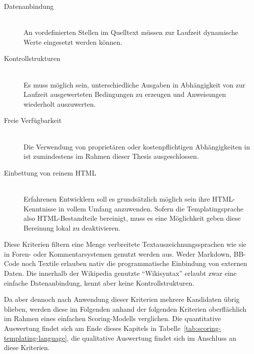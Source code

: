 \begin{description}
\item[Datenanbindung] \hfill \\
  An vordefinierten Stellen im Quelltext müssen zur Laufzeit dynamische Werte eingesetzt werden können.
\item[Kontrollstrukturen] \hfill \\
  Es muss möglich sein, unterschiedliche Ausgaben in Abhängigkeit von zur Laufzeit ausgewerteten Bedingungen zu erzeugen und Anweisungen wiederholt auszuwerten.
\item[Freie Verfügbarkeit] \hfill \\
  Die Verwendung von proprietären oder kostenpflichtigen Abhängigkeiten in \idename ist zumindestens im Rahmen dieser Thesis ausgeschlossen.
\item[Einbettung von reinem HTML] \hfill \\
  Erfahrenen Entwicklern soll es grundsätzlich möglich sein ihre HTML-Kennt\-nisse in vollem Umfang anzuwenden. Sofern die Templatingsprache also HTML-Be\-stand\-teile bereinigt, muss es eine Möglichkeit geben diese Bereinung lokal zu deaktivieren.
\end{description}

Diese Kriterien filtern eine Menge verbreitete Textauszeichnungssprachen wie sie in Foren- oder Kommentarsystemen genutzt werden aus. Weder Markdown, BB-Code noch Textile erlauben nativ die programmatische Einbindung von externen Daten. Die innerhalb der Wikipedia genutzte "`Wikisyntax"' erlaubt zwar eine einfache Datenanbindung, kennt aber keine Kontrollstrukturen.

Da aber dennoch nach Anwendung dieser Kriterien mehrere Kandidaten übrig blieben, werden diese im Folgenden anhand der folgenden Kriterien oberflächlich im Rahmen eines einfachen Scoring-Modells verglichen. Die quantitative Auswertung findet sich am Ende dieses Kapitels in Tabelle~\ref{tab:scoring-templating-language}, die qualitative Auswertung findet sich im Anschluss an diese Kriterien.

